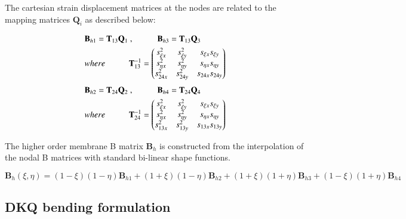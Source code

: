 The cartesian strain displacement matrices at the nodes are related to the mapping matrices $\mathbf{Q}_i$ as described below:

\begin{gather} 
	\begin{aligned}
		&\mathbf{B}_{h1} = \mathbf{T}_{13}  \mathbf{Q}_{1}\ ,
		\hspace{10mm}
		\mathbf{B}_{h3} = \mathbf{T}_{13}  \mathbf{Q}_{3}\\
		&where 
		\hspace{10mm} 
		\mathbf{T}_{13}^{-1} =
		\begin{pmatrix}
			s_{\xi x}^2 & s_{\xi y}^2 & s_{\xi x} s_{\xi y} \\
			s_{\eta x}^2 & s_{\eta y}^2 & s_{\eta x} s_{\eta y} \\
			s_{24 x}^2 & s_{24 y}^2 & s_{24 x} s_{24 y}
		\end{pmatrix}
		\label{equation17}
	\end{aligned}
\end{gather}
\begin{gather} 
	\begin{aligned}
		&\mathbf{B}_{h2} = \mathbf{T}_{24}  \mathbf{Q}_{2}\ ,
		\hspace{10mm}
		\mathbf{B}_{h4} = \mathbf{T}_{24}  \mathbf{Q}_{4}\\
		&where 
		\hspace{10mm} 
		\mathbf{T}_{24}^{-1} =
		\begin{pmatrix}
			s_{\xi x}^2 & s_{\xi y}^2 & s_{\xi x} s_{\xi y} \\
			s_{\eta x}^2 & s_{\eta y}^2 & s_{\eta x} s_{\eta y} \\
			s_{13 x}^2 & s_{13 y}^2 & s_{13 x} s_{13 y}
		\end{pmatrix}
		\label{equation18}
	\end{aligned}
\end{gather}

The higher order membrane B matrix $\mathbf{B}_h$ is constructed from the interpolation of the nodal B matrices with standard bi-linear shape functions.

\begin{equation} 
\mathbf{B}_h(\xi,\eta) = (1-\xi)(1-\eta)\mathbf{B}_{h1} + (1+\xi)(1-\eta)\mathbf{B}_{h2} + (1+\xi)(1+\eta)\mathbf{B}_{h3} +	(1-\xi)(1+\eta)\mathbf{B}_{h4} 
\label{equation19}
\end{equation}


\subsection{DKQ bending formulation}

